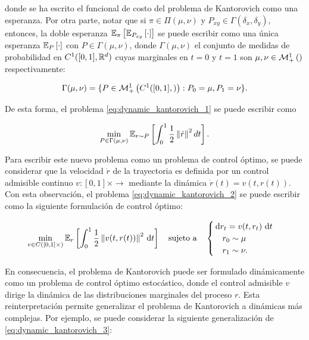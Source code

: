 donde se ha escrito el funcional de costo del problema de Kantorovich como una esperanza. Por otra parte, notar que si $\pi\in\Pi(\mu,\nu)$ y $P_{xy}\in \Gamma(\delta_x,\delta_y)$, entonces, la doble esperanza $\mathbb{E}_{\pi}\left[\mathbb{E}_{P_{xy}}\left[\cdot\right]\right]$ se puede escribir como una única esperanza $\mathbb{E}_{P}\left[\cdot\right]$ con $P\in\Gamma(\mu,\nu)$, donde $\Gamma(\mu,\nu)$ el conjunto de medidas de probabilidad en $C^1([0,1],\mathbb{R}^d)$ cuyas marginales en $t=0$ y $t=1$ son $\mu,\nu\in\mathcal{M}_+^1\left(\right)$ respectivamente:

\begin{equation*}
	\Gamma(\mu,\nu) = \{P\in \mathcal{M}_+^1\left(C^1([0,1],)\right): P_0=\mu, P_1 = \nu\} .
\end{equation*}

De esta forma, el problema \eqref{eq:dynamic_kantorovich_1} se puede escribir como

\begin{equation}
	\label{eq:dynamic_kantorovich_2}
	\min_{P\in \Gamma(\mu,\nu)} \mathbb{E}_{r\sim P}\left[\int_0^1 \frac{1}{2} \left\lVert \dot{r} \right\rVert^2 dt\right].
\end{equation}

Para escribir este nuevo problema como un problema de control óptimo, se puede considerar que la velocidad $\dot{r}$ de la trayectoria es definida por un control admisible continuo $v:[0,1]\times\xspace\to\xspace$ mediante la dinámica $\dot r(t)=v(t,r(t))$. Con esta observación, el problema \eqref{eq:dynamic_kantorovich_2} se puede escribir como la siguiente formulación de control óptimo:

\begin{equation}
	\label{eq:dynamic_kantorovich_3}
	\min_{v\in C([0,1]\times)} \mathbb{E}_{r}\left[\int_0^1 \frac{1}{2} \left\lVert v(t,r(t)) \right\rVert^2 \,\operatorname{d}\! t\right]
	\quad \text{sujeto a} \quad
	\begin{cases}
		\,\operatorname{d}\! r_t = v(t,r_t)\,\operatorname{d}\! t\\
		\quad r_0\sim\mu\\
		\quad r_1\sim\nu .
	\end{cases}
\end{equation}

En consecuencia, el problema de Kantorovich puede ser formulado dinámicamente como un problema de control óptimo estocástico, donde el control admisible $v$ dirige la dinámica de las distribuciones marginales del proceso $r$. Esta reinterpretación permite generalizar el problema de Kantorovich a dinámicas más complejas. Por ejemplo, se puede considerar la siguiente generalización de \eqref{eq:dynamic_kantorovich_3}:

